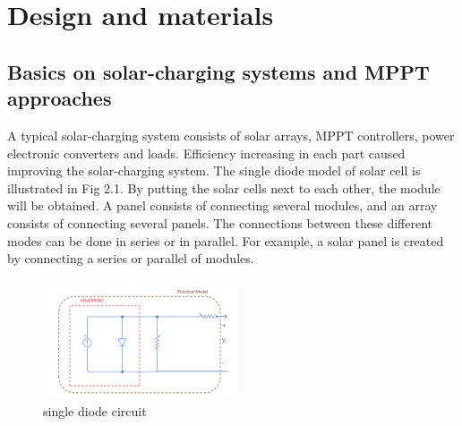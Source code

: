 \chapter{Design and materials}



\section{Basics on solar-charging systems and MPPT approaches }
A typical solar-charging system consists of solar arrays, MPPT controllers, power
electronic converters and loads. Efficiency increasing in each part caused improving
the solar-charging system. The single diode model of solar cell is illustrated in Fig 2.1. By putting the solar cells next to each other, the module will be obtained. A panel consists
of connecting several modules, and an array consists of connecting several panels.
The connections between these different modes can be done in series or in parallel.
For example, a solar panel is created by connecting a series or parallel of modules.
\begin{figure}[h]
	\centering\includegraphics[height=3.5cm]{./images/single diode circuit}
	\caption{single diode circuit}
\end{figure}
